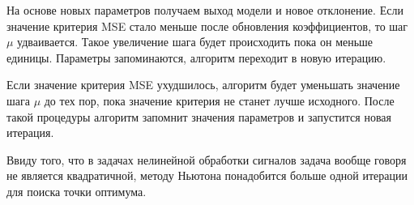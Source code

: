 На основе новых параметров получаем выход модели и новое отклонение. Если значение критерия MSE стало меньше после обновления коэффициентов, то шаг $\mu$ удваивается. Такое увеличение шага будет происходить пока он меньше единицы. Параметры запоминаются, алгоритм переходит в новую итерацию. 

Если значение критерия MSE ухудшилось, алгоритм будет уменьшать значение шага $\mu$ до тех пор, пока значение критерия не станет лучше исходного. После такой процедуры алгоритм запомнит значения параметров и запустится новая итерация.

Ввиду того, что в задачах нелинейной обработки сигналов задача вообще говоря не является квадратичной, методу Ньютона понадобится больше одной итерации для поиска точки оптимума.
\begin{algorithm}[!ht]
	\caption{Демпфированный метод Ньютона}
	\label{alg:newton_damped}
\end{algorithm}



